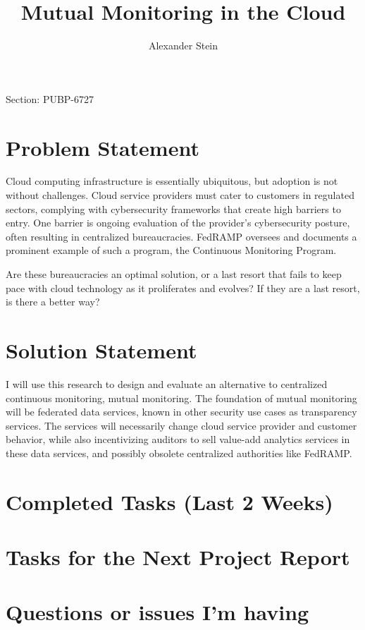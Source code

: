 \documentclass{jdf}
\begin{document}
Section: PUBP-6727
\title{Mutual Monitoring in the Cloud}
\author{Alexander Stein}

\maketitle
\thispagestyle{fancy}


\section*{Problem Statement}

Cloud computing infrastructure is essentially ubiquitous, but adoption is not without challenges. Cloud service providers must cater to customers in regulated sectors, complying with cybersecurity frameworks that create high barriers to entry. One barrier is ongoing evaluation of the provider's cybersecurity posture, often resulting in centralized bureaucracies. FedRAMP oversees and documents a prominent example of such a program, the Continuous Monitoring Program.

Are these bureaucracies an optimal solution, or a last resort that fails to keep pace with cloud technology as it proliferates and evolves? If they are a last resort, is there a better way?

\section*{Solution Statement}

I will use this research to design and evaluate an alternative to centralized continuous monitoring, mutual monitoring. The foundation of mutual monitoring will be federated data services, known in other security use cases as transparency services. The services will necessarily change cloud service provider and customer behavior, while also incentivizing auditors to sell value-add analytics services in these data services, and possibly obsolete centralized authorities like FedRAMP.

\section*{Completed Tasks (Last 2 Weeks)}

\section*{Tasks for the Next Project Report}

\section*{Questions or issues I'm having}
\end{document}
